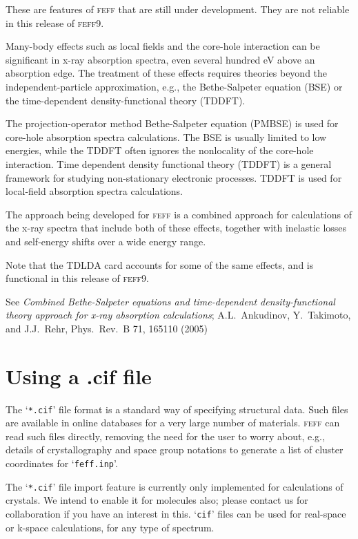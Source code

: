 \documentclass[11pt,oneside]{report} %
\renewcommand{\htmlref}[2]{\hyperlink{#2}{#1}}
\newcommand{\program}[1]{\textsc{#1}}
\newcommand{\feff}{\program{feff}}
\newcommand{\vnum}{9}
\newcommand{\feffcur}{\feff\vnum}
\newcommand{\file}[1]{`\texttt{#1}'}
\renewcommand{\htmlref}[2]{{#1}} %
\begin{document}
These are features of {\feff} that are still under development. 
They are not reliable in this release of {\feffcur}.

Many-body effects such as local fields and the core-hole interaction 
can be significant in x-ray absorption spectra, even several hundred 
eV above an absorption edge. The treatment of these effects requires 
theories beyond the independent-particle approximation, e.g., the Bethe-Salpeter
equation (BSE) or the time-dependent density-functional theory (TDDFT).

The projection-operator method Bethe-Salpeter equation (PMBSE) is used 
for core-hole absorption spectra calculations. The BSE is usually limited 
to low energies, while the TDDFT often ignores the nonlocality of the 
core-hole interaction. Time dependent density functional theory (TDDFT) 
is a general framework for studying non-stationary electronic processes. 
TDDFT is used for local-field absorption spectra calculations. 

The approach being developed for {\feff} is a combined approach for 
calculations of the x-ray spectra that include both of these effects, 
together with inelastic losses and self-energy shifts over a wide 
energy range. 

Note that the \htmlref{TDLDA}{card:tdl} card accounts for some of the same 
effects, and is functional in this release of {\feffcur}.

See \emph{Combined Bethe-Salpeter equations and time-dependent density-functional 
theory approach for x-ray absorption calculations}; A.L.\ Ankudinov, Y.\ Takimoto, 
and J.J.\ Rehr, Phys.\ Rev.\ B 71, 165110 (2005)



\section{Using a .cif file}

The \file{*.cif} file format is a standard way of specifying structural data.  Such files are available in online databases for a very large number of materials.  {\feff} can read such files directly, removing the need for the user to worry about, e.g., details of crystallography and space group notations to generate a list of cluster coordinates for \file{feff.inp}.  

The \file{*.cif} file import feature is currently only implemented for calculations of crystals.  We intend to enable it for molecules also; please contact us for collaboration if you have an interest in this.  \file{cif} files can be used for real-space or k-space calculations, for any type of spectrum.
\end{document}
